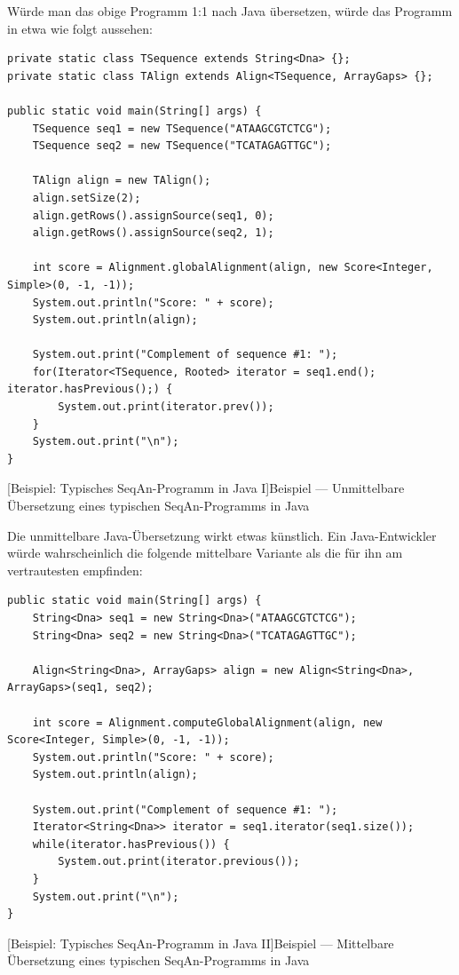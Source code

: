 \bigskip

Würde man das obige Programm 1:1 nach Java übersetzen, würde das Programm in etwa wie folgt aussehen:

\begin{center}
\begin{verbatim}
private static class TSequence extends String<Dna> {};
private static class TAlign extends Align<TSequence, ArrayGaps> {};

public static void main(String[] args) {
    TSequence seq1 = new TSequence("ATAAGCGTCTCG");
    TSequence seq2 = new TSequence("TCATAGAGTTGC");

    TAlign align = new TAlign();
    align.setSize(2);
    align.getRows().assignSource(seq1, 0);
    align.getRows().assignSource(seq2, 1);

    int score = Alignment.globalAlignment(align, new Score<Integer, Simple>(0, -1, -1));
    System.out.println("Score: " + score);
    System.out.println(align);

    System.out.print("Complement of sequence #1: ");
    for(Iterator<TSequence, Rooted> iterator = seq1.end(); iterator.hasPrevious();) {
        System.out.print(iterator.prev());
    }
    System.out.print("\n");
}
\end{verbatim}
[Beispiel: Typisches SeqAn-Programm in Java I]{Beispiel --- Unmittelbare Übersetzung eines typischen SeqAn-Programms in Java}
\label{lst:seqan-typical-java1}
\end{center}

\bigskip

Die unmittelbare Java-Übersetzung wirkt etwas künstlich. Ein Java-Entwickler würde wahrscheinlich die folgende mittelbare Variante als die für ihn am vertrautesten empfinden:

\begin{center}
\begin{verbatim}
public static void main(String[] args) {
    String<Dna> seq1 = new String<Dna>("ATAAGCGTCTCG");
    String<Dna> seq2 = new String<Dna>("TCATAGAGTTGC");

    Align<String<Dna>, ArrayGaps> align = new Align<String<Dna>, ArrayGaps>(seq1, seq2);

    int score = Alignment.computeGlobalAlignment(align, new Score<Integer, Simple>(0, -1, -1));
    System.out.println("Score: " + score);
    System.out.println(align);

    System.out.print("Complement of sequence #1: ");
    Iterator<String<Dna>> iterator = seq1.iterator(seq1.size());
    while(iterator.hasPrevious()) {
        System.out.print(iterator.previous());
    }
    System.out.print("\n");
}
\end{verbatim}
[Beispiel: Typisches SeqAn-Programm in Java II]{Beispiel --- Mittelbare Übersetzung eines typischen SeqAn-Programms in Java}
\label{lst:seqan-typical-java2}
\end{center}

